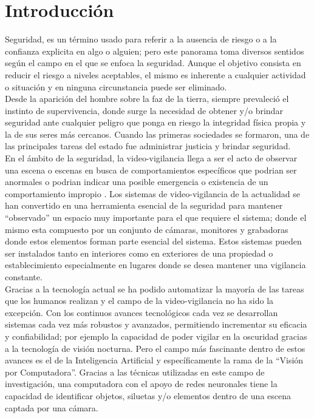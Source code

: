 \chapter{Introducción}

Seguridad, es un término usado para referir a la ausencia de riesgo o a la confianza explicita en algo o alguien; pero este panorama toma diversos sentidos según el campo en el que se enfoca la seguridad. Aunque el objetivo consista en reducir el riesgo a niveles aceptables, el mismo es inherente a cualquier actividad o situación y en ninguna circunstancia puede ser eliminado.\\

Desde la aparición del hombre sobre la faz de la tierra, siempre prevaleció el instinto de supervivencia, donde surge la necesidad de obtener y/o brindar seguridad ante cualquier peligro que ponga en riesgo la integridad física propia y la de sus seres más cercanos. Cuando las primeras sociedades se formaron, una de las principales tareas del estado fue administrar justicia y brindar seguridad.\\

En el ámbito de la seguridad, la video-vigilancia llega a ser el acto de observar una escena o escenas en busca de comportamientos específicos que podrian ser anormales o podrian indicar una posible emergencia o existencia de un comportamiento impropio \cite{NORMAN:201795}. Los sistemas de video-vigilancia de la actualidad se han convertido en una herramienta esencial de la seguridad para mantener ``observado'' un espacio muy importante para el que requiere el sistema; donde el mismo esta compuesto por un conjunto de cámaras, monitores y grabadoras donde estos elementos forman parte esencial del sistema. Estos sistemas pueden ser instalados tanto en interiores como en exteriores de una propiedad o establecimiento especialmente en lugares donde se desea mantener una vigilancia constante.\\

Gracias a la tecnología actual se ha podido automatizar la mayoría de las tareas que los humanos realizan y el campo de la video-vigilancia no ha sido la excepción. Con los continuos avances tecnológicos cada vez se desarrollan sistemas cada vez más robustos y avanzados, permitiendo incrementar su eficacia y confiabilidad; por ejemplo la capacidad de poder vigilar en la oscuridad gracias a la tecnología de visión nocturna. Pero el campo más fascinante dentro de estos avances es el de la Inteligencia Artificial y específicamente la rama de la ``Visión por Computadora''. Gracias a las técnicas utilizadas en este campo de investigación, una computadora con el apoyo de redes neuronales tiene la capacidad de identificar objetos, siluetas y/o elementos dentro de una escena captada por una cámara.\\

